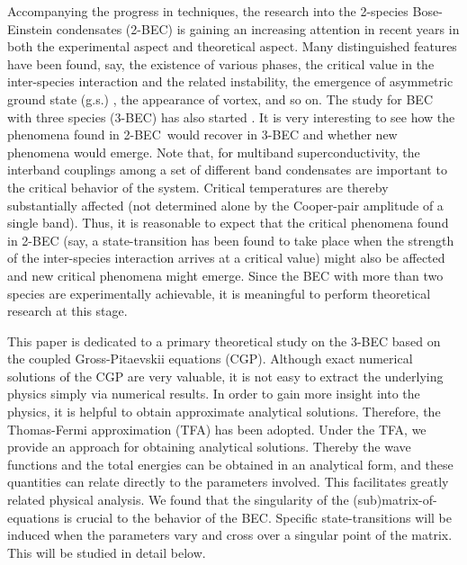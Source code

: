\documentclass[single-column,showpacs,groupedaddress]{revtex4}
\begin{document}
Accompanying the progress in techniques, the research into the 2-species
Bose-Einstein condensates (2-BEC) is gaining an increasing attention in
recent years in both the experimental aspect \cite%
{myat97,ande05,ni08,pilc09,nemi09,wack15,mgr} and theoretical aspect\cite%
{ho96,esry97,pu98,chui99,tripp00,ribo02,chui03,luo07,nott15,
scha15,inde15,kuop15,roy15,luo08,polo15,jsy,mpe,rci,nitta}. Many
distinguished features have been found, say, the existence of various
phases, the critical value in the inter-species interaction and the related
instability, the emergence of asymmetric ground state (g.s.) \cite%
{esry97,chui99,tripp00}, the appearance of vortex, and so on. The study for
BEC with three species (3-BEC) has also started \cite{cal,man,orl,v2}. It is
very interesting to see how the phenomena found in 2-BEC\ would recover in
3-BEC and whether new phenomena would emerge. Note that, for multiband
superconductivity, the interband couplings among a set of different band
condensates are important to the critical behavior of the system. Critical
temperatures are thereby substantially affected (not determined alone by the
Cooper-pair amplitude of a single band)\cite{s1,s2,s3}. Thus, it is
reasonable to expect that the critical phenomena found in 2-BEC (say, a
state-transition has been found to take place when the strength of the
inter-species interaction arrives at a critical value\cite{prep}) might also
be affected and new critical phenomena might emerge. Since the BEC with more
than two species are experimentally achievable, it is meaningful to perform
theoretical research at this stage.

This paper is dedicated to a primary theoretical study on the 3-BEC based on
the coupled Gross-Pitaevskii equations (CGP). Although exact numerical
solutions of the CGP are very valuable, it is not easy to extract the
underlying physics simply via numerical results. In order to gain more
insight into the physics, it is helpful to obtain approximate analytical
solutions. Therefore, the Thomas-Fermi approximation (TFA) has been adopted.
Under the TFA, we provide an approach for obtaining analytical solutions.
Thereby the wave functions and the total energies can be obtained in an
analytical form, and these quantities can relate directly to the parameters
involved. This facilitates greatly related physical analysis. We found that
the singularity of the (sub)matrix-of-equations is crucial to the behavior
of the BEC. Specific state-transitions will be induced when the parameters
vary and cross over a singular point of the matrix. This will be studied in
detail below.
\end{document}
